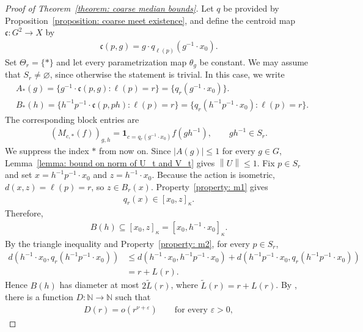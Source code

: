 \documentclass[12pt,reqno]{amsart}
\newcommand{\N}{\mathbb{N}}
\newcommand{\norm}[1]{\left\|#1\right\|}
\numberwithin{equation}{section}
\begin{document}
\begin{proof}[Proof of Theorem~\ref{theorem: coarse median bounds}]
    Let $q$ be provided by Proposition~\ref{proposition: coarse meet existence}, and define the centroid map $\mathfrak{c}:G^2\to X$ by
    \begin{align*}
        \mathfrak{c}(p,g)=g\cdot q_{\ell(p)}(g^{-1}\cdot x_0).
    \end{align*}
    Set $\Theta_r=\{*\}$ and let every parametrization map $\theta_g$ be constant. We may assume that $S_r\ne\varnothing$, since otherwise the statement is trivial.
    In this case, we write
    \begin{align*}
        &A_*(g)=\{g^{-1}\cdot \mathfrak{c}(p,g): \ell(p)=r\}=\{q_r(g^{-1}\cdot x_0)\}.\\
        &B_*(h)=\{h^{-1}p^{-1}\cdot \mathfrak{c}(p,ph): \ell(p)=r\}=\{q_r(h^{-1}p^{-1}\cdot x_0):\ell(p)=r\}.
    \end{align*}
    The corresponding block entries are
    \begin{align*}
        (M_{c,*}(f))_{g,h}=\mathbf{1}_{c=q_r(g^{-1}\cdot x_0)}f(gh^{-1}),\qquad gh^{-1}\in S_r.
    \end{align*}
    We suppress the index $*$ from now on. Since $|A(g)|\le1$ for every $g\in G$, Lemma~\ref{lemma: bound on norm of U_t and V_t} gives $\norm{U}\le1$. Fix $p\in S_r$ and set $x=h^{-1}p^{-1}\cdot x_0$ and $z=h^{-1}\cdot x_0$. Because the action is isometric, $d(x,z)=\ell(p)=r$, so $z\in B_r(x)$. Property~\ref{property: m1} gives 
    \begin{align*}
        q_r(x)\in [x_0,z]_\kappa.
    \end{align*}
    Therefore,
    \begin{align*}
        B(h)\subseteq [x_0,z]_\kappa=[x_0,h^{-1}\cdot x_0]_\kappa.
    \end{align*}
    By the triangle inequality and Property~\ref{property: m2}, for every $p\in S_r$,
    \begin{align*}
        d(h^{-1}\cdot x_0, q_r(h^{-1}p^{-1}\cdot x_0))&\le d(h^{-1}\cdot x_0, h^{-1}p^{-1}\cdot x_0)+d(h^{-1}p^{-1}\cdot x_0, q_r(h^{-1}p^{-1}\cdot x_0))\\
        &=r+L(r).
    \end{align*}
    Hence $B(h)$ has diameter at most $2\widetilde{L}(r)$, where $\widetilde{L}(r)=r+L(r)$. By \cite[Proposition 9.8]{Bowditch2014embedding}, there is a function $D:\N\to\N$ such that
    \begin{align*}
        D(r)=o(r^{\nu+\varepsilon})\qquad\text{for every }\varepsilon>0,

\end{align*}
\end{proof}
\end{document}
